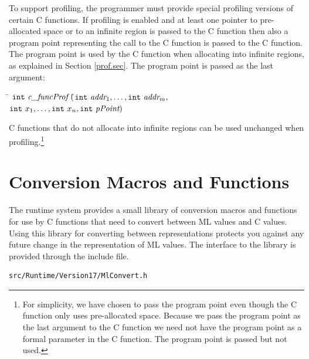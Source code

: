 \documentclass[12pt]{book}
\begin{document}
To support profiling, the programmer must provide special profiling
versions of certain C functions. If profiling is enabled and at least
one pointer to pre-allocated space or to an infinite region is passed
to the C function then also a program point representing the call to
the C function is passed to the C function. The program point is used
by the C function when allocating into infinite regions, as explained
in Section \ref{prof.sec}. The program point is passed as the last
argument:
\begin{tabbing}
\indent\=  $\texttt{int} \ \emph{c\_funcProf} \ ($\=$\texttt{int}\ \emph{addr}_1,
    \ldots, \texttt{int}\ \emph{addr}_m,$\\
  \>\>$ \texttt{int}\ x_1, \ldots,
    \texttt{int}\ x_n, \texttt{int}\ \emph{pPoint}) $
\end{tabbing}
\noindent
C functions that do not allocate into infinite regions can be used unchanged
when profiling.\footnote{For simplicity, we have chosen to pass the program
  point even though the C function only uses pre-allocated space.  Because
  we pass the program point as the last argument to the C function we need
  not have the program point as a formal parameter in the C function. The
  program point is passed but not used.}

\section{Conversion Macros and Functions}
The runtime system provides a small library of conversion macros and
functions for use by C functions that need to convert between ML
values and C values. Using this library for converting between
representations protects you against any future change in the
representation of ML values.  The interface to the library is provided
through the include file.
\begin{verbatim}
src/Runtime/Version17/MlConvert.h
\end{verbatim}

\end{document}
